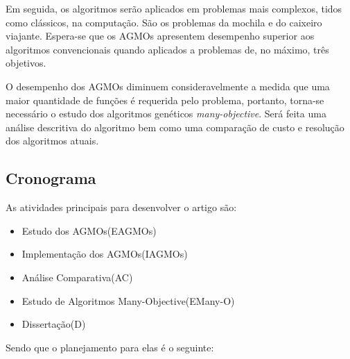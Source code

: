 \documentclass[]{article}
\begin{document}
	Em seguida, os algoritmos serão aplicados em problemas mais complexos, tidos como clássicos, na computação. São os problemas da mochila e do caixeiro viajante. Espera-se que os AGMOs apresentem desempenho superior aos algoritmos convencionais quando aplicados a problemas de, no máximo, três objetivos.
	
	O desempenho dos AGMOs diminuem consideravelmente a medida que uma maior quantidade de funções é requerida pelo problema, portanto, torna-se necessário o estudo dos algoritmos genéticos \textit{many-objective}. Será feita uma análise descritiva do algoritmo bem como uma comparação de custo e resolução dos algoritmos atuais.
	
\subsection{Cronograma}

	As atividades principais para desenvolver o artigo são:
	
\begin{itemize}
	\item Estudo dos AGMOs(EAGMOs)
	\item Implementação dos AGMOs(IAGMOs) 
	\item Análise Comparativa(AC)
	\item Estudo de Algoritmos Many-Objective(EMany-O)
	\item Dissertação(D)
\end{itemize}
	
	Sendo que o planejamento para elas é o seguinte:
	
\end{document}
